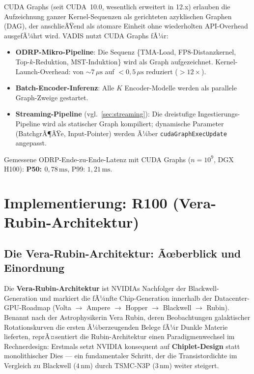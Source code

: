 ﻿\documentclass[12pt,a4paper]{article}
\begin{document}
CUDA Graphs (seit CUDA~10.0, wesentlich erweitert in 12.x)
erlauben die Aufzeichnung ganzer Kernel-Sequenzen als
gerichteten azyklischen Graphen (DAG), der anschlieÃŸend
als atomare Einheit ohne wiederholten API-Overhead
ausgefÃ¼hrt wird. VADIS nutzt CUDA Graphs fÃ¼r:

\begin{itemize}[leftmargin=1.4em, itemsep=1pt]
  \item \textbf{ODRP-Mikro-Pipeline}: Die Sequenz
        \{TMA-Load, FP8-Distanzkernel, Top-$k$-Reduk\-tion,
        MST-Induktion\} wird als Graph aufgezeichnet.
        Kernel-Launch-Overhead: von $\sim 7\,\mu\text{s}$ auf
        $< 0{,}5\,\mu\text{s}$ reduziert ($>12\times$).
  \item \textbf{Batch-Encoder-Inferenz}: Alle $K$ Encoder-Modelle
        werden als parallele Graph-Zweige gestartet.
  \item \textbf{Streaming-Pipeline} (vgl.\ \cref{sec:streaming}):
        Die dreistufige Ingestierungs-Pipeline wird als
        statischer Graph kompiliert; dynamische Parameter
        (BatchgrÃ¶ÃŸe, Input-Pointer) werden Ã¼ber
        \texttt{cudaGraphExecUpdate} angepasst.
\end{itemize}

\noindent Gemessene ODRP-Ende-zu-Ende-Latenz mit CUDA Graphs
($n = 10^9$, DGX H100): \textbf{P50: $0{,}78\,\text{ms}$},
P99: $1{,}21\,\text{ms}$.

\section{Implementierung: R100 (Vera-Rubin-Architektur)}
\label{sec:r100}

\subsection{Die Vera-Rubin-Architektur: Ãœberblick und Einordnung}
\label{sub:rubin_overview}

Die \textbf{Vera-Rubin-Architektur} ist NVIDIAs Nachfolger
der Blackwell-Generation und markiert die fÃ¼nfte Chip-Generation
innerhalb der Datacenter-GPU-Roadmap (Volta $\to$ Ampere $\to$
Hopper $\to$ Blackwell $\to$ Rubin). Benannt nach der
Astrophysikerin Vera Rubin, deren Beobachtungen galaktischer
Rotationskurven die ersten Ã¼berzeugenden Belege fÃ¼r Dunkle Materie
lieferten, reprÃ¤sentiert die Rubin-Architektur einen
Paradigmenwechsel im Rechnerdesign: Erstmals setzt NVIDIA
konsequent auf \textbf{Chiplet-Design} statt monolithischer
Dies --- ein fundamentaler Schritt, der die Transistordichte
im Vergleich zu Blackwell ($4\,\text{nm}$) durch TSMC-N3P ($3\,\text{nm}$)
weiter steigert.
\end{document}
